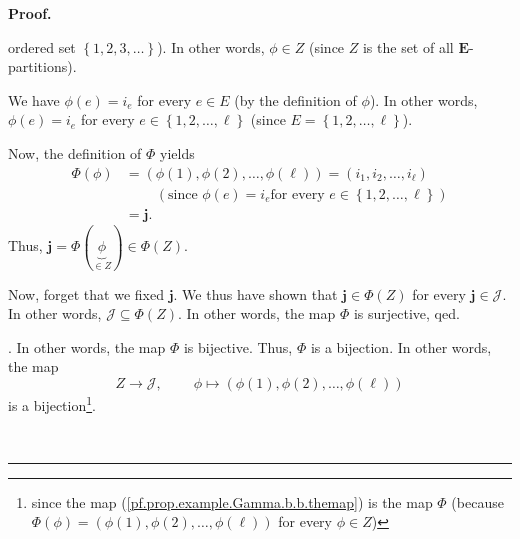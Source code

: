 \documentclass[numbers=enddot,12pt,final,onecolumn,notitlepage,abstracton]{scrartcl}
\theoremstyle{definition}
\newenvironment{proof}[1][Proof]{\noindent\textbf{#1.} }{\ \rule{0.5em}{0.5em}}
\newenvironment{verlong}{}{}
\begin{document}
\begin{verlong}
\begin{footnotesize}
\begin{proof}
{ordered set $\left\{  1,2,3,\ldots\right\}  $). In other words, $\phi\in Z$
(since $Z$ is the set of all $\mathbf{E}$-partitions).
\par
We have $\phi\left(  e\right)  =i_{e}$ for every $e\in E$ (by the definition
of $\phi$). In other words, $\phi\left(  e\right)  =i_{e}$ for every
$e\in\left\{  1,2,\ldots,\ell\right\}  $ (since $E=\left\{  1,2,\ldots
,\ell\right\}  $).
\par
Now, the definition of $\Phi$ yields%
\begin{align*}
\Phi\left(  \phi\right)   &  =\left(  \phi\left(  1\right)  ,\phi\left(
2\right)  ,\ldots,\phi\left(  \ell\right)  \right)  =\left(  i_{1}%
,i_{2},\ldots,i_{\ell}\right) \\
&  \ \ \ \ \ \ \ \ \ \ \left(  \text{since }\phi\left(  e\right)  =i_{e}\text{
for every }e\in\left\{  1,2,\ldots,\ell\right\}  \right) \\
&  =\mathbf{j}.
\end{align*}
Thus, $\mathbf{j}=\Phi\left(  \underbrace{\phi}_{\in Z}\right)  \in\Phi\left(
Z\right)  $.
\par
Now, forget that we fixed $\mathbf{j}$. We thus have shown that $\mathbf{j}%
\in\Phi\left(  Z\right)  $ for every $\mathbf{j}\in\mathcal{J}$. In other
words, $\mathcal{J}\subseteq\Phi\left(  Z\right)  $. In other words, the map
$\Phi$ is surjective, qed.}. In other words, the map $\Phi$ is bijective.
Thus, $\Phi$ is a bijection. In other words, the map%
\begin{equation}
Z\rightarrow\mathcal{J},\ \ \ \ \ \ \ \ \ \ \phi\mapsto\left(  \phi\left(
1\right)  ,\phi\left(  2\right)  ,\ldots,\phi\left(  \ell\right)  \right)
\label{pf.prop.example.Gamma.b.b.themap}%
\end{equation}
is a bijection\footnote{since the map (\ref{pf.prop.example.Gamma.b.b.themap})
is the map $\Phi$ (because $\Phi\left(  \phi\right)  =\left(  \phi\left(
1\right)  ,\phi\left(  2\right)  ,\ldots,\phi\left(  \ell\right)  \right)  $
for every $\phi\in Z$)}.


\end{proof}
\end{footnotesize}
\end{verlong}
\end{document}

